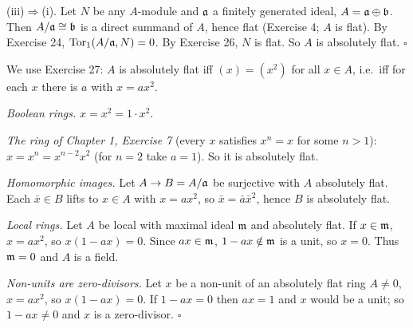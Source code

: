 \documentclass[11pt]{article}
\begin{document}
(iii)$\Rightarrow$(i). Let $N$ be any $A$-module and $\mathfrak a$ a finitely generated ideal, $A=\mathfrak a\oplus\mathfrak b$. Then $A/\mathfrak a\cong\mathfrak b$ is a direct summand of $A$, hence flat (Exercise 4; $A$ is flat). By Exercise 24, $\operatorname{Tor}_1(A/\mathfrak a,N)=0$. By Exercise 26, $N$ is flat. So $A$ is absolutely flat. \hfill$\square$

\pf
We use Exercise 27: $A$ is absolutely flat iff $(x)=(x^2)$ for all $x\in A$, i.e.\ iff for each $x$ there is $a$ with $x=ax^2$.

\emph{Boolean rings.} $x=x^2=1\cdot x^2$.

\emph{The ring of Chapter 1, Exercise 7} (every $x$ satisfies $x^n=x$ for some $n>1$): $x=x^n=x^{n-2}x^2$ (for $n=2$ take $a=1$). So it is absolutely flat.

\emph{Homomorphic images.} Let $A\to B=A/\mathfrak a$ be surjective with $A$ absolutely flat. Each $\bar x\in B$ lifts to $x\in A$ with $x=ax^2$, so $\bar x=\bar a\bar x^2$, hence $B$ is absolutely flat.

\emph{Local rings.} Let $A$ be local with maximal ideal $\mathfrak m$ and absolutely flat. If $x\in\mathfrak m$, $x=ax^2$, so $x(1-ax)=0$. Since $ax\in\mathfrak m$, $1-ax\notin\mathfrak m$ is a unit, so $x=0$. Thus $\mathfrak m=0$ and $A$ is a field.

\emph{Non-units are zero-divisors.} Let $x$ be a non-unit of an absolutely flat ring $A\neq0$, $x=ax^2$, so $x(1-ax)=0$. If $1-ax=0$ then $ax=1$ and $x$ would be a unit; so $1-ax\ne0$ and $x$ is a zero-divisor. \hfill$\square$
\end{document}
